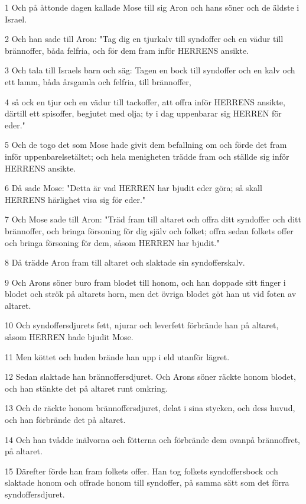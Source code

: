 \par 1 Och på åttonde dagen kallade Mose till sig Aron och hans söner och de äldste i Israel.
\par 2 Och han sade till Aron: "Tag dig en tjurkalv till syndoffer och en vädur till brännoffer, båda felfria, och för dem fram inför HERRENS ansikte.
\par 3 Och tala till Israels barn och säg: Tagen en bock till syndoffer och en kalv och ett lamm, båda årsgamla och felfria, till brännoffer,
\par 4 så ock en tjur och en vädur till tackoffer, att offra inför HERRENS ansikte, därtill ett spisoffer, begjutet med olja; ty i dag uppenbarar sig HERREN för eder."
\par 5 Och de togo det som Mose hade givit dem befallning om och förde det fram inför uppenbarelsetältet; och hela menigheten trädde fram och ställde sig inför HERRENS ansikte.
\par 6 Då sade Mose: "Detta är vad HERREN har bjudit eder göra; så skall HERRENS härlighet visa sig för eder."
\par 7 Och Mose sade till Aron: "Träd fram till altaret och offra ditt syndoffer och ditt brännoffer, och bringa försoning för dig själv och folket; offra sedan folkets offer och bringa försoning för dem, såsom HERREN har bjudit."
\par 8 Då trädde Aron fram till altaret och slaktade sin syndofferskalv.
\par 9 Och Arons söner buro fram blodet till honom, och han doppade sitt finger i blodet och strök på altarets horn, men det övriga blodet göt han ut vid foten av altaret.
\par 10 Och syndoffersdjurets fett, njurar och leverfett förbrände han på altaret, såsom HERREN hade bjudit Mose.
\par 11 Men köttet och huden brände han upp i eld utanför lägret.
\par 12 Sedan slaktade han brännoffersdjuret. Och Arons söner räckte honom blodet, och han stänkte det på altaret runt omkring.
\par 13 Och de räckte honom brännoffersdjuret, delat i sina stycken, och dess huvud, och han förbrände det på altaret.
\par 14 Och han tvådde inälvorna och fötterna och förbrände dem ovanpå brännoffret, på altaret.
\par 15 Därefter förde han fram folkets offer. Han tog folkets syndoffersbock och slaktade honom och offrade honom till syndoffer, på samma sätt som det förra syndoffersdjuret.

